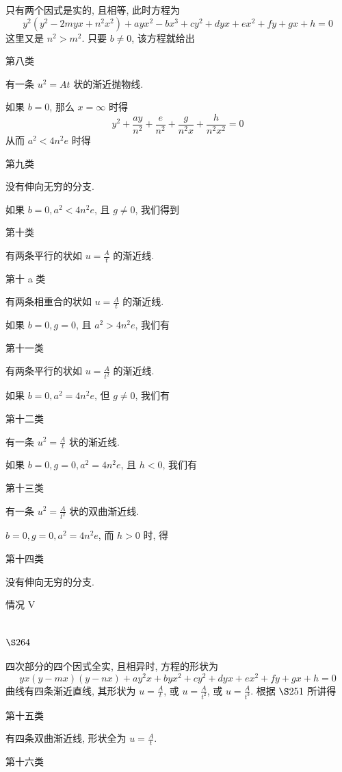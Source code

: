 只有两个因式是实的, 且相等, 此时方程为
\[
y^{2}\left(y^{2}-2 m y x+n^{2} x^{2}\right)+a y x^{2}-b x^{3}+c y^{2}+d y x+e x^{2}+f y+g x+h=0
\]
这里又是 $n^{2}>m^{2}$. 只要 $b \neq 0$, 该方程就给出

第八类

有一条 $u^{2}=A t$ 状的渐近抛物线.

如果 $b=0$, 那么 $x=\infty$ 时得
\[
y^{2}+\frac{a y}{n^{2}}+\frac{e}{n^{2}}+\frac{g}{n^{2} x}+\frac{h}{n^{2} x^{2}}=0
\]
从而 $a^{2}<4 n^{2} e$ 时得

第九类

没有伸向无穷的分支.

如果 $b=0, a^{2}<4 n^{2} e$, 且 $g \neq 0$, 我们得到

第十类

有两条平行的状如 $u=\frac{A}{t}$ 的渐近线.

第十 a 类

有两条相重合的状如 $u=\frac{A}{t}$ 的渐近线.

如果 $b=0, g=0$, 且 $a^{2}>4 n^{2} e$, 我们有

第十一类

有两条平行的状如 $u=\frac{A}{t^{2}}$ 的渐近线.

如果 $b=0, a^{2}=4 n^{2} e$, 但 $g \neq 0$, 我们有

第十二类

有一条 $u^{2}=\frac{A}{t}$ 状的渐近线.

如果 $b=0, g=0, a^{2}=4 n^{2} e$, 且 $h<0$, 我们有 

第十三类

有一条 $u^{2}=\frac{A}{t^{2}}$ 状的双曲渐近线.

$b=0, g=0, a^{2}=4 n^{2} e$, 而 $h>0$ 时, 得

第十四类

没有伸向无穷的分支.

情况 V

\section{$\S 264$}

四次部分的四个因式全实, 且相异时, 方程的形状为
\[
y x(y-m x)(y-n x)+a y^{2} x+b y x^{2}+c y^{2}+d y x+e x^{2}+f y+g x+h=0
\]
曲线有四条渐近直线, 其形状为 $u=\frac{A}{t}$, 或 $u=\frac{A}{t^{2}}$, 或 $u=\frac{A}{t^{3}}$. 根据 $\S 251$ 所讲得

第十五类

有四条双曲渐近线, 形状全为 $u=\frac{A}{t}$.

第十六类

